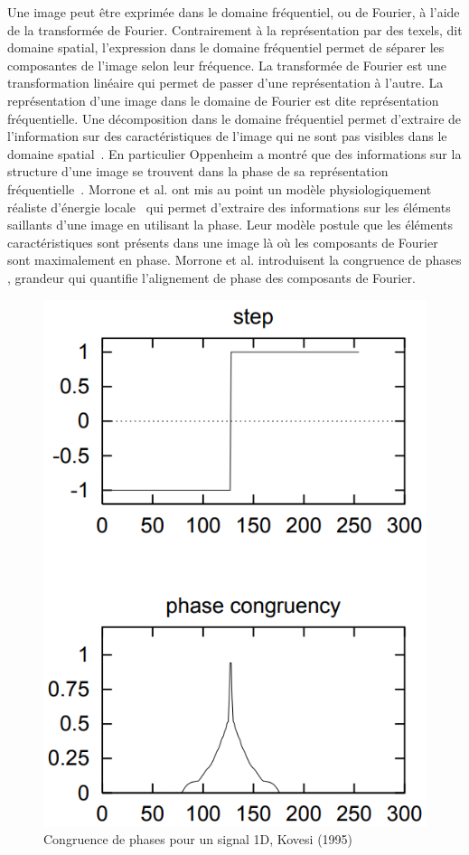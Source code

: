 Une image peut être exprimée dans le domaine fréquentiel, ou de Fourier, à l'aide de la transformée de Fourier. Contrairement à la représentation par des texels, dit domaine spatial, l'expression dans le domaine fréquentiel permet de séparer les composantes de l'image selon leur fréquence. La transformée de Fourier est une transformation linéaire qui permet de passer d'une représentation à l'autre. La représentation d'une image dans le domaine de Fourier est dite représentation fréquentielle. Une décomposition dans le domaine fréquentiel permet d'extraire de l'information sur des caractéristiques de l'image qui ne sont pas visibles dans le domaine spatial~\cite{strumillo_fourier}. En particulier Oppenheim a montré que des informations sur la structure d'une image se trouvent dans la phase de sa représentation fréquentielle~\cite{oppenheim_importance_1981}. Morrone et al. ont mis au point un modèle physiologiquement réaliste d'énergie locale~\cite{morrone_feature_1987, morrone_feature_1988} qui permet d'extraire des informations sur les éléments saillants d'une image en utilisant la phase. Leur modèle postule que les éléments caractéristiques sont présents dans une image là où les composants de Fourier sont maximalement en phase. Morrone et al. introduisent la \og congruence de phases \fg, grandeur qui quantifie l'alignement de phase des composants de Fourier.

\bigskip

\begin{figure}[h]
    \centering
    \includegraphics[width=.35\linewidth]{contenu/resources/images/pc_1d_kovesi}
    \caption[Congruence de phases pour un signal 1D]{Congruence de phases pour un signal 1D, Kovesi (1995)~\cite{kovesi_image_1995}}
    \label{fig:pc-1D-kovesi}
\end{figure}

